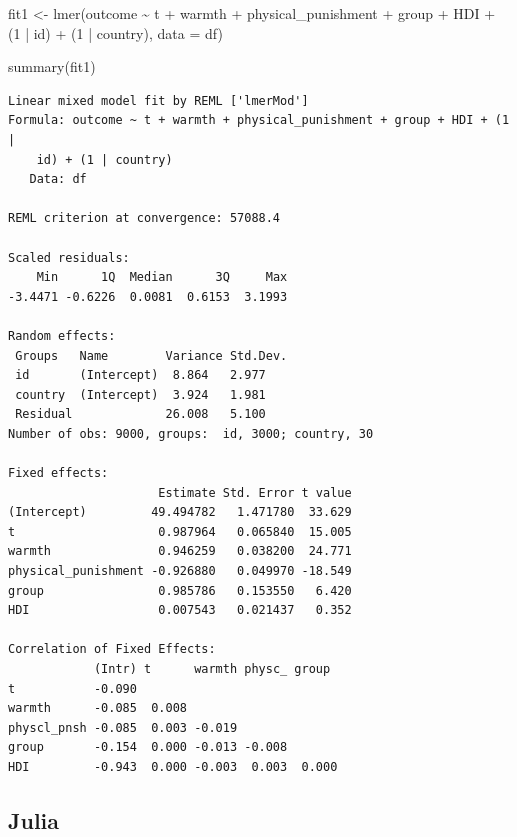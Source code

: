 \documentclass[
  letterpaper,
  DIV=11,
  numbers=noendperiod]{scrreprt}
\newenvironment{Shaded}{\begin{snugshade}}{\end{snugshade}}
\newcommand{\AttributeTok}[1]{\textcolor[rgb]{0.40,0.45,0.13}{#1}}
\newcommand{\DecValTok}[1]{\textcolor[rgb]{0.68,0.00,0.00}{#1}}
\newcommand{\FunctionTok}[1]{\textcolor[rgb]{0.28,0.35,0.67}{#1}}
\newcommand{\NormalTok}[1]{\textcolor[rgb]{0.00,0.23,0.31}{#1}}
\newcommand{\OtherTok}[1]{\textcolor[rgb]{0.00,0.23,0.31}{#1}}
\newcommand{\SpecialCharTok}[1]{\textcolor[rgb]{0.37,0.37,0.37}{#1}}
\begin{document}
\begin{Shaded}
\begin{Highlighting}[]
\NormalTok{fit1 }\OtherTok{\textless{}{-}} \FunctionTok{lmer}\NormalTok{(outcome }\SpecialCharTok{\textasciitilde{}}\NormalTok{ t }\SpecialCharTok{+}\NormalTok{ warmth }\SpecialCharTok{+}\NormalTok{ physical\_punishment }\SpecialCharTok{+} 
\NormalTok{               group }\SpecialCharTok{+}\NormalTok{ HDI }\SpecialCharTok{+}
\NormalTok{               (}\DecValTok{1} \SpecialCharTok{|}\NormalTok{ id) }\SpecialCharTok{+}
\NormalTok{               (}\DecValTok{1} \SpecialCharTok{|}\NormalTok{ country),}
             \AttributeTok{data =}\NormalTok{ df)}

\FunctionTok{summary}\NormalTok{(fit1)}
\end{Highlighting}
\end{Shaded}

\begin{verbatim}
Linear mixed model fit by REML ['lmerMod']
Formula: outcome ~ t + warmth + physical_punishment + group + HDI + (1 |  
    id) + (1 | country)
   Data: df

REML criterion at convergence: 57088.4

Scaled residuals: 
    Min      1Q  Median      3Q     Max 
-3.4471 -0.6226  0.0081  0.6153  3.1993 

Random effects:
 Groups   Name        Variance Std.Dev.
 id       (Intercept)  8.864   2.977   
 country  (Intercept)  3.924   1.981   
 Residual             26.008   5.100   
Number of obs: 9000, groups:  id, 3000; country, 30

Fixed effects:
                     Estimate Std. Error t value
(Intercept)         49.494782   1.471780  33.629
t                    0.987964   0.065840  15.005
warmth               0.946259   0.038200  24.771
physical_punishment -0.926880   0.049970 -18.549
group                0.985786   0.153550   6.420
HDI                  0.007543   0.021437   0.352

Correlation of Fixed Effects:
            (Intr) t      warmth physc_ group 
t           -0.090                            
warmth      -0.085  0.008                     
physcl_pnsh -0.085  0.003 -0.019              
group       -0.154  0.000 -0.013 -0.008       
HDI         -0.943  0.000 -0.003  0.003  0.000
\end{verbatim}

\subsection{Julia}
\end{document}
